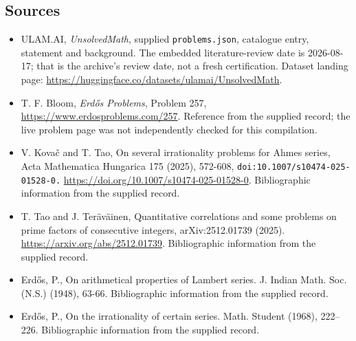 \documentclass[11pt,a4paper]{article}
\begin{document}
\subsection{Sources}

{\small

\begin{itemize}

\item[\hypertarget{source:statement:1}{S1}] ULAM.AI, \emph{UnsolvedMath}, supplied \texttt{problems.json}, catalogue entry, statement and background. The embedded literature-review date is 2026-08-17; that is the archive’s review date, not a fresh certification. Dataset landing page: \url{https://huggingface.co/datasets/ulamai/UnsolvedMath}.

\item[\hypertarget{source:statement:2}{S2}] T. F. Bloom, \emph{Erdős Problems}, Problem 257, \url{https://www.erdosproblems.com/257}. Reference from the supplied record; the live problem page was not independently checked for this compilation.

\item[\hypertarget{source:statement:3}{S3}] V. Kovač and T. Tao, On several irrationality problems for Ahmes series, Acta Mathematica Hungarica 175 (2025), 572-608, \nolinkurl{doi:10.1007/s10474-025-01528-0.} \url{https://doi.org/10.1007/s10474-025-01528-0}. Bibliographic information from the supplied record.

\item[\hypertarget{source:statement:4}{S4}] T. Tao and J. Teräväinen, Quantitative correlations and some problems on prime factors of consecutive integers, arXiv:2512.01739 (2025). \url{https://arxiv.org/abs/2512.01739}. Bibliographic information from the supplied record.

\item[\hypertarget{source:statement:5}{S5}] Erd\H{o}s, P., On arithmetical properties of Lambert series. J. Indian Math. Soc. (N.S.) (1948), 63-66. Bibliographic information from the supplied record.

\item[\hypertarget{source:statement:6}{S6}] Erd\H{o}s, P., On the irrationality of certain series. Math. Student (1968), 222--226. Bibliographic information from the supplied record.

\end{itemize}

}

\label{end:statement}
\end{document}
